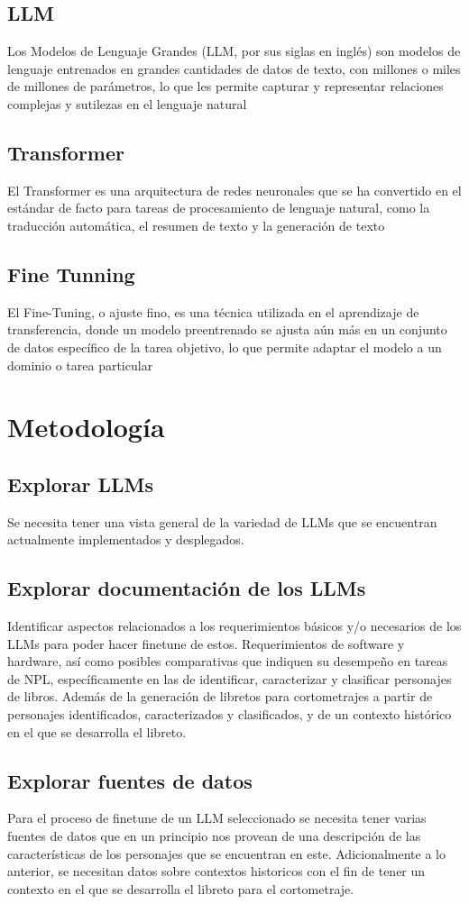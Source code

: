 \documentclass[journal,onecolumn]{IEEEtran}
\begin{document}
	\subsection{LLM}
	Los Modelos de Lenguaje Grandes (LLM, por sus siglas en inglés) son modelos de lenguaje entrenados en grandes cantidades de datos de texto, con millones o miles de millones de parámetros, lo que les permite capturar y representar relaciones complejas y sutilezas en el lenguaje natural
	\subsection{Transformer}
	El Transformer es una arquitectura de redes neuronales que se ha convertido en el estándar de facto para tareas de procesamiento de lenguaje natural, como la traducción automática, el resumen de texto y la generación de texto
	\subsection{Fine Tunning}
	El Fine-Tuning, o ajuste fino, es una técnica utilizada en el aprendizaje de transferencia, donde un modelo preentrenado se ajusta aún más en un conjunto de datos específico de la tarea objetivo, lo que permite adaptar el modelo a un dominio o tarea particular
	\section{Metodología}
	\subsection{Explorar LLMs}
	Se necesita tener una vista general de la variedad de LLMs que se encuentran actualmente implementados y desplegados.
	\subsection{Explorar documentación de los LLMs}
	Identificar aspectos relacionados a los requerimientos básicos y/o necesarios de los LLMs para poder hacer finetune de estos. Requerimientos de software y hardware, así como posibles comparativas que indiquen su desempeño en tareas de NPL, específicamente en las de identificar, caracterizar y clasificar personajes de libros. Además de la generación de libretos para cortometrajes a partir de personajes identificados, caracterizados y clasificados, y de un contexto histórico en el que se desarrolla el libreto.
	\subsection{Explorar fuentes de datos}
	Para el proceso de finetune de un LLM seleccionado se necesita tener varias fuentes de datos que en un principio nos provean de una descripción de las características de los personajes que se encuentran en este. Adicionalmente a lo anterior, se necesitan datos sobre contextos historicos con el fin de tener un contexto en el que se desarrolla el libreto para el cortometraje.
\end{document}
